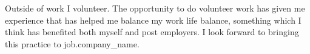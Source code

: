 Outside of work I volunteer. The opportunity to do volunteer work has given me experience that has helped me balance my work life balance, something which I think has benefited both myself and post employers. I look forward to bringing this practice to {{job.company_name}}.
